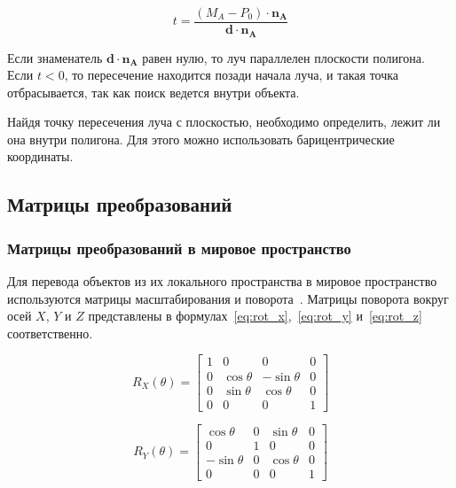 \begin{equation}
    \label{eq:t-intersect}
    t = \frac{(M_A - P_0) \cdot \mathbf{n_A}}{\mathbf{d} \cdot \mathbf{n_A}}
\end{equation}

Если знаменатель $\mathbf{d} \cdot \mathbf{n_A}$ равен нулю, то луч параллелен плоскости полигона. Если $t < 0$, то пересечение находится позади начала луча, и такая точка отбрасывается, так как поиск ведется внутри объекта.

Найдя точку пересечения луча с плоскостью, необходимо определить, лежит ли она внутри полигона. Для этого можно использовать барицентрические координаты.

\subsection{Матрицы преобразований}

\subsubsection{Матрицы преобразований в мировое пространство}
Для перевода объектов из их локального пространства в мировое пространство используются матрицы масштабирования и поворота~\cite{foley, rogers, porev}.
Матрицы поворота вокруг осей $X$, $Y$ и $Z$ представлены в формулах~\eqref{eq:rot_x},~\eqref{eq:rot_y} и~\eqref{eq:rot_z} соответственно.

\begin{equation}
    \label{eq:rot_x}
    R_X(\theta) =
    \begin{bmatrix}
        1 & 0 & 0 & 0 \\
        0 & \cos\theta & -\sin\theta & 0 \\
        0 & \sin\theta & \cos\theta & 0 \\
        0 & 0 & 0 & 1
    \end{bmatrix}
\end{equation}

\begin{equation}
    \label{eq:rot_y}
    R_Y(\theta) =
    \begin{bmatrix}
        \cos\theta & 0 & \sin\theta & 0 \\
        0 & 1 & 0 & 0 \\
        -\sin\theta & 0 & \cos\theta & 0 \\
        0 & 0 & 0 & 1
    \end{bmatrix}
\end{equation}

